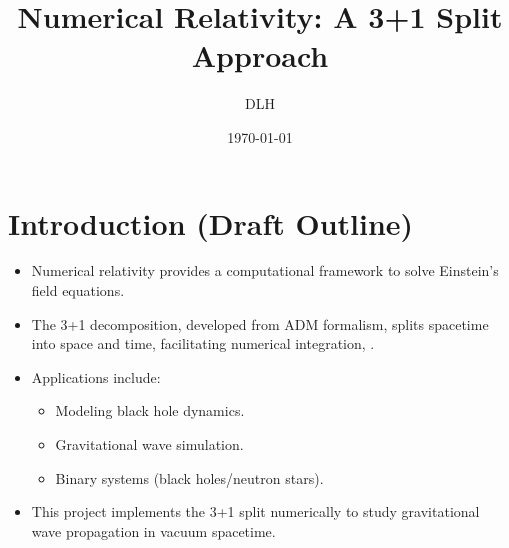 \documentclass[12pt]{article}
\title{Numerical Relativity: A 3+1 Split Approach}
\author{DLH}
\date{\today}
\begin{document}
\maketitle
\tableofcontents

\section{Introduction (Draft Outline)}
\begin{itemize}
    \item Numerical relativity provides a computational framework to solve Einstein's field equations.
    \item The 3+1 decomposition, developed from ADM formalism, splits spacetime into space and time, facilitating numerical integration, \cite{baumgarte2010numerical}.
    \item Applications include:
    \begin{itemize}
        \item Modeling black hole dynamics.
        \item Gravitational wave simulation.
        \item Binary systems (black holes/neutron stars).
    \end{itemize}
    \item This project implements the 3+1 split numerically to study gravitational wave propagation in vacuum spacetime.
\end{itemize}
\end{document}
